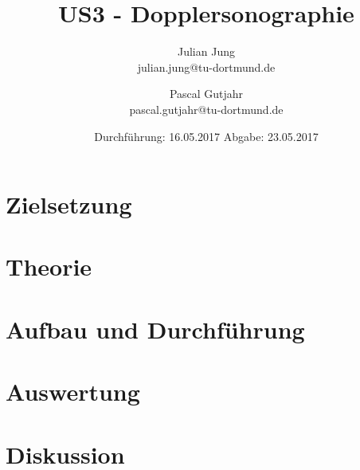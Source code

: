 

\title{US3 - Dopplersonographie}
\author{Julian Jung \\ julian.jung@tu-dortmund.de
  \and Pascal Gutjahr \\ pascal.gutjahr@tu-dortmund.de}
  \date{Durchführung: 16.05.2017
  \hspace{3em}
  Abgabe: 23.05.2017}
  
\maketitle
\newpage
\tableofcontents
\newpage
\section{Zielsetzung}
\section{Theorie}
\section{Aufbau und Durchführung}
\section{Auswertung}
\section{Diskussion}
% 
\printbibliography

